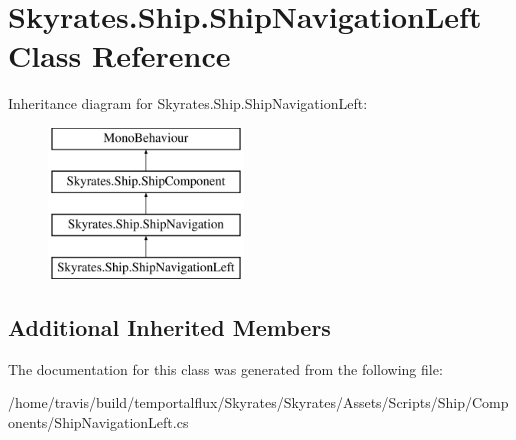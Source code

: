 \hypertarget{class_skyrates_1_1_ship_1_1_ship_navigation_left}{\section{Skyrates.\-Ship.\-Ship\-Navigation\-Left Class Reference}
\label{class_skyrates_1_1_ship_1_1_ship_navigation_left}
}
Inheritance diagram for Skyrates.\-Ship.\-Ship\-Navigation\-Left\-:\begin{figure}[H]
\begin{center}
\leavevmode
\includegraphics[height=4.000000cm]{class_skyrates_1_1_ship_1_1_ship_navigation_left}
\end{center}
\end{figure}
\subsection*{Additional Inherited Members}


The documentation for this class was generated from the following file\-:\begin{DoxyCompactItemize}
\item 
/home/travis/build/temportalflux/\-Skyrates/\-Skyrates/\-Assets/\-Scripts/\-Ship/\-Components/Ship\-Navigation\-Left.\-cs\end{DoxyCompactItemize}
